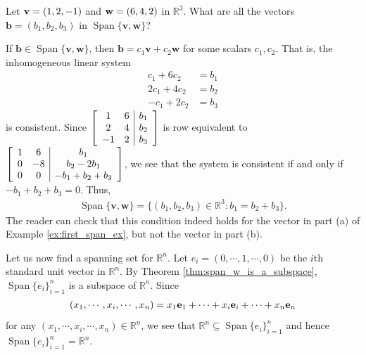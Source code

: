 \documentclass[12pt,letterpaper,reqno]{article}
\numberwithin{equation}{section}
\newcommand{\R}{\ensuremath{\mathbb R}}
\DeclareMathOperator{\Span}{Span}
\begin{document}
\begin{exercise}\label{ex:all_the_vectors_in_the_span}
Let ${\bf v}=(1,2,-1)$ and ${\bf w}=(6,4,2)$ in $\mathbb{R}^3$. What are all the vectors $\mathbf{b}=(b_1,b_2,b_3)$ in $\Span \{\mathbf{v}, \mathbf{w}\}$?	
\end{exercise}

{\color{red}
\begin{solution}
	If $\mathbf{b} \in \Span \{\mathbf{v}, \mathbf{w}\}$, then $\mathbf{b}=c_1\mathbf{v}+c_2\mathbf{w}$ for some scalars $c_1,c_2$. That is, the inhomogeneous linear system
	\begin{align*}
		c_1+6c_2&=b_1 \\
		2c_1+4c_2&=b_2 \\
		-c_1+2c_2&=b_3
	\end{align*}
	is consistent. Since $\left[\begin{array}{c c | c}
		1 & 6  & b_1 \\
	2 & 4 & b_2 \\
	-1 & 2 & b_3
	\end{array}\right]$ is row equivalent to $\left[\begin{array}{c c | c}
		1 & 6  & b_1 \\
	0 & -8 & b_2-2b_1 \\
	0 & 0 & -b_1+b_2+b_3
	\end{array}\right]$, we see that the system is consistent if and only if $-b_1+b_2+b_3=0$. Thus,
	\begin{align*}
		\Span \{\mathbf{v},\mathbf{w}\}=\{(b_1,b_2,b_3)\in \mathbb{R}^3:b_1=b_2+b_3\}.
	\end{align*}
	The reader can check that this condition indeed holds for the vector in part (a) of Example \ref{ex:first_span_ex}, but not the vector in part (b).
\end{solution}}



\begin{example}\label{ex:standard_unit_vectors_span_r_n}
	Let us now find a spanning set for $\mathbb{R}^n$. Let $e_i=(0,\cdots,1,\cdots,0)$ be the $i$th standard unit vector in $\mathbb{R}^n$. By Theorem \ref{thm:span_w_is_a_subspace}, $\Span \{e_i\}_{i=1}^n$ is a subspace of $\mathbb{R}^n$. Since 
	\begin{align*}
	(x_1,\cdots,x_i,\cdots,x_n)=x_1{\bf e}_1+\cdots+x_i{\bf e}_i+\cdots+x_n{\bf e}_n	
	\end{align*}
for any $(x_1,\cdots,x_i,\cdots,x_n) \in \mathbb{R}^n$, we see that $\R^n \subseteq \Span \{e_i\}_{i=1}^n$ and hence $\Span \{e_i\}_{i=1}^n=\R^n$.
\end{example}
\end{document}
